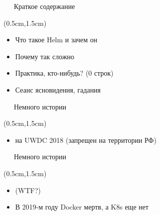 \documentclass[xetex,18pt,aspectratio=43]{beamer}
\begin{document}
\begin{Large}

\begin{frame}{\ \ \ Краткое содержание}
\begin{textblock*}{\framewidth-0.8cm}(0.5cm,1.5cm)
\begin{itemize}
  \item Что такое Helm и зачем он
  \item Почему так сложно
  \item Практика, кто-нибудь? (0 строк)
  \item Сеанс ясновидения, гадания
\end{itemize}
\end{textblock*}
\end{frame}

\begin{frame}{\ \ \ Немного истории}
\begin{textblock*}{\framewidth-0.8cm}(0.5cm,1.5cm)
\begin{itemize}
  \item \href{https://www.slideshare.net/alexclear/configuration-management-and-kubernetes}{\color{blue}{Мой доклад}} на UWDC 2018 (запрещен на территории РФ)
\end{itemize}
\end{textblock*}
\end{frame}

\begin{frame}{\ \ \ Немного истории}
\begin{textblock*}{\framewidth-0.8cm}(0.5cm,1.5cm)
\begin{itemize}
  \item \href{https://clck.ru/JfDuX}{\color{blue}{https://clck.ru/JfDuX}} (WTF?)
  \item В 2019-м году Docker мертв, а K8s еще нет
\end{itemize}
\end{textblock*}
\end{frame}


\end{Large}
\end{document}
